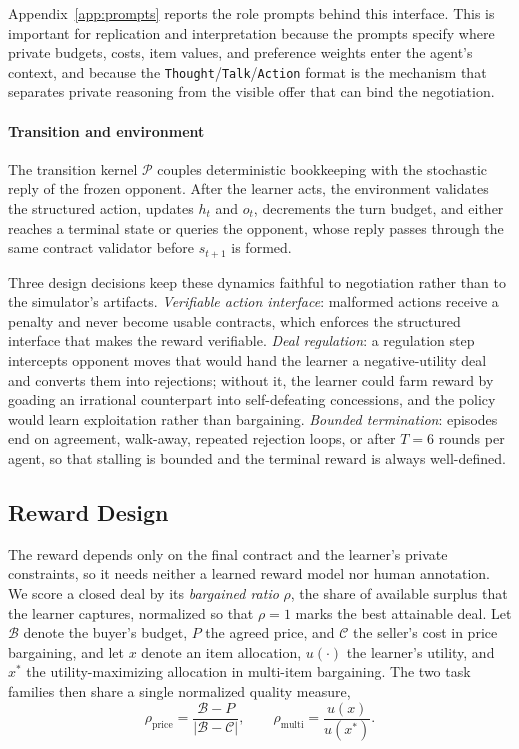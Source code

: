 \documentclass{interact}
\theoremstyle{plain}
\theoremstyle{definition}
\theoremstyle{remark}
\begin{document}
Appendix~\ref{app:prompts} reports the role prompts behind this interface. This is important for replication and interpretation because the prompts specify where private budgets, costs, item values, and preference weights enter the agent's context, and because the \texttt{Thought}/\texttt{Talk}/\texttt{Action} format is the mechanism that separates private reasoning from the visible offer that can bind the negotiation.

\paragraph{Transition and environment}
The transition kernel $\mathcal{P}$ couples deterministic bookkeeping with the stochastic reply of the frozen opponent. After the learner acts, the environment validates the structured action, updates $h_t$ and $o_t$, decrements the turn budget, and either reaches a terminal state or queries the opponent, whose reply passes through the same contract validator before $s_{t+1}$ is formed. 

Three design decisions keep these dynamics faithful to negotiation rather than to the simulator's artifacts. \emph{Verifiable action interface}: malformed actions receive a penalty and never become usable contracts, which enforces the structured interface that makes the reward verifiable. \emph{Deal regulation}: a regulation step intercepts opponent moves that would hand the learner a negative-utility deal and converts them into rejections; without it, the learner could farm reward by goading an irrational counterpart into self-defeating concessions, and the policy would learn exploitation rather than bargaining. \emph{Bounded termination}: episodes end on agreement, walk-away, repeated rejection loops, or after $T{=}6$ rounds per agent, so that stalling is bounded and the terminal reward is always well-defined.

\subsection{Reward Design}\label{sec:reward}

The reward depends only on the final contract and the learner's private constraints, so it needs neither a learned reward model nor human annotation. We score a closed deal by its \emph{bargained ratio} $\rho$, the share of available surplus that the learner captures, normalized so that $\rho = 1$ marks the best attainable deal. Let $\mathcal{B}$ denote the buyer's budget, $P$ the agreed price, and $\mathcal{C}$ the seller's cost in price bargaining, and let $x$ denote an item allocation, $u(\cdot)$ the learner's utility, and $x^{\ast}$ the utility-maximizing allocation in multi-item bargaining. The two task families then share a single normalized quality measure,
\begin{equation}
\rho_{\mathrm{price}} = \frac{\mathcal{B} - P}{\lvert \mathcal{B} - \mathcal{C} \rvert},
\qquad
\rho_{\mathrm{multi}} = \frac{u(x)}{u(x^{\ast})}.
\label{eq:bargained_ratio}
\end{equation}
\end{document}
